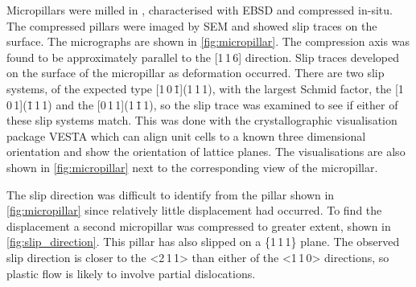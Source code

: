Micropillars were milled in , characterised with EBSD and compressed in-situ. The compressed pillars were imaged by SEM and showed slip traces on the surface. The micrographs are shown in \autoref{fig:micropillar}. The compression axis was found to be approximately parallel to the [1\,1\,6] direction. Slip traces developed on the surface of the micropillar as deformation occurred. There are two slip systems, of the expected type [1\,0\,\={1}](1\,1\,1), with the largest Schmid factor, the [1\,0\,1](\={1}\,1\,1) and the [0\,1\,1](1\,\={1}\,1), so the slip trace was examined to see if either of these slip systems match. This was done with the crystallographic visualisation package VESTA \cite{Momma2011} which can align unit cells to a known three dimensional orientation and show the orientation of lattice planes. The visualisations are also shown in \autoref{fig:micropillar} next to the corresponding view of the micropillar.



The slip direction was difficult to identify from the pillar shown in \autoref{fig:micropillar} since relatively little displacement had occurred. To find the displacement a second micropillar was compressed to greater extent, shown in \autoref{fig:slip_direction}. This pillar has also slipped on a \{1\,1\,1\} plane. The observed slip direction is closer to the <2\,1\,1> than either of the <1\,1\,0> directions, so plastic flow is likely to involve partial dislocations.

